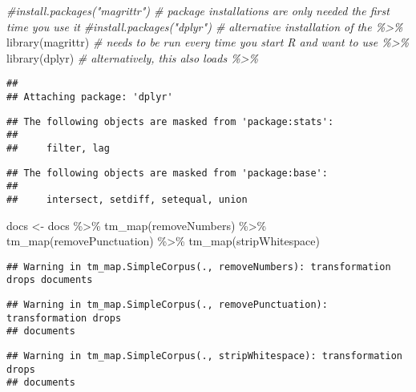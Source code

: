 \documentclass[
]{article}
\newenvironment{Shaded}{\begin{snugshade}}{\end{snugshade}}
\newcommand{\CommentTok}[1]{\textcolor[rgb]{0.56,0.35,0.01}{\textit{#1}}}
\newcommand{\FunctionTok}[1]{\textcolor[rgb]{0.00,0.00,0.00}{#1}}
\newcommand{\NormalTok}[1]{#1}
\newcommand{\OtherTok}[1]{\textcolor[rgb]{0.56,0.35,0.01}{#1}}
\newcommand{\SpecialCharTok}[1]{\textcolor[rgb]{0.00,0.00,0.00}{#1}}
\begin{document}
\begin{Shaded}
\begin{Highlighting}[]
\CommentTok{\#install.packages("magrittr") \# package installations are only needed the first time you use it}
\CommentTok{\#install.packages("dplyr")    \# alternative installation of the \%\textgreater{}\%}
\FunctionTok{library}\NormalTok{(magrittr) }\CommentTok{\# needs to be run every time you start R and want to use \%\textgreater{}\%}
\FunctionTok{library}\NormalTok{(dplyr)    }\CommentTok{\# alternatively, this also loads \%\textgreater{}\%}
\end{Highlighting}
\end{Shaded}

\begin{verbatim}
## 
## Attaching package: 'dplyr'
\end{verbatim}

\begin{verbatim}
## The following objects are masked from 'package:stats':
## 
##     filter, lag
\end{verbatim}

\begin{verbatim}
## The following objects are masked from 'package:base':
## 
##     intersect, setdiff, setequal, union
\end{verbatim}

\begin{Shaded}
\begin{Highlighting}[]
\NormalTok{docs }\OtherTok{\textless{}{-}}\NormalTok{ docs }\SpecialCharTok{\%\textgreater{}\%}
  \FunctionTok{tm\_map}\NormalTok{(removeNumbers) }\SpecialCharTok{\%\textgreater{}\%}
  \FunctionTok{tm\_map}\NormalTok{(removePunctuation) }\SpecialCharTok{\%\textgreater{}\%}
  \FunctionTok{tm\_map}\NormalTok{(stripWhitespace)}
\end{Highlighting}
\end{Shaded}

\begin{verbatim}
## Warning in tm_map.SimpleCorpus(., removeNumbers): transformation drops documents
\end{verbatim}

\begin{verbatim}
## Warning in tm_map.SimpleCorpus(., removePunctuation): transformation drops
## documents
\end{verbatim}

\begin{verbatim}
## Warning in tm_map.SimpleCorpus(., stripWhitespace): transformation drops
## documents
\end{verbatim}
\end{document}
